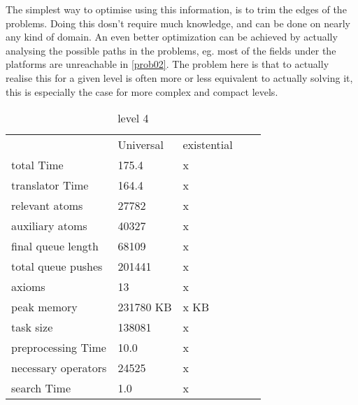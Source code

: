 			The simplest way to optimise using this information, is to trim the edges of the problems. Doing this dosn't require much knowledge, and can be done on nearly any kind of domain.	An even better optimization can be achieved by actually analysing the possible paths in the problems, eg. most of the fields under the platforms are unreachable in \ref{prob02}. The problem here is that to actually realise this for a given level is often more or less equivalent to actually solving it, this is especially the case for more complex and compact levels. 
		
			
			\begin{table}[h]
				\centering
				\caption{level 4}
				\label{lvl4}
				\begin{tabular}{lllll}
					& Universal & existential  \\
					total Time& 175.4 & x \\
					translator Time& 164.4 &x  \\
					
					
					relevant atoms & 27782 & x\\
					auxiliary atoms & 40327 &x \\
					final queue length & 68109 &x \\
					total queue pushes & 201441 &x \\
					axioms & 13 & x \\ 
					peak memory & 231780 KB &x  KB\\ 
					task size & 138081 &x \\
					
					preprocessing Time& 10.0 &  x\\
					necessary operators & 24525 & x\\
					
					search Time & 1.0 &x  \\
				\end{tabular}
			\end{table}
			

